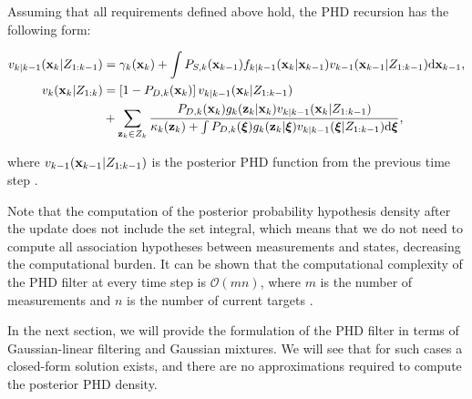 \begin{theorem}\label{theorem:phd-recursion}
    Assuming that all requirements defined above hold, the PHD recursion has the following form:

    \begin{align}
        v_{k|k-1}(\vecat{x}{k} | Z_{1:k-1})
        &= \gamma_k(\vecat{x}{k}) + \int P_{S,k}(\vecat{x}{k-1}) f_{k|k-1}(\vecat{x}{k} | \vecat{x}{k-1}) v_{k-1}(\vecat{x}{k-1} | Z_{1:k-1}) \mathrm{d} \vecat{x}{k-1}, \\
        v_k(\vecat{x}{k} | Z_{1:k})
        &= \left[1-P_{D,k}(\vecat{x}{k})\right] v_{k|k-1}(\vecat{x}{k} | Z_{1:k-1}) \\
        &+ \sum_{\vecat{z}{k} \in Z_k} \frac{
            P_{D,k}(\vecat{x}{k}) g_k(\vecat{z}{k} | \vecat{x}{k}) v_{k|k-1}(\vecat{x}{k} | Z_{1:k-1})
        }{
            \kappa_k(\vecat{z}{k}) + \int P_{D,k}(\boldsymbol{\xi}) g_k(\vecat{z}{k} | \boldsymbol{\xi}) v_{k|k-1}(\boldsymbol{\xi} | Z_{1:k-1}) \mathrm{d} \boldsymbol{\xi}
        },
    \end{align}

    \noindent where $v_{k-1}(\vecat{x}{k-1} | Z_{1:k-1})$ is the posterior PHD function from the previous time step \cite{voGaussianMixtureProbability2006} \cite[588--591]{mahlerStatisticalMultisourcemultitargetInformation2007}.
\end{theorem}

Note that the computation of the posterior probability hypothesis density after the update does not include the set integral, which means that we do not need to compute all association hypotheses between measurements and states, decreasing the computational burden. It can be shown that the computational complexity of the PHD filter at every time step is $\mathcal{O}(mn)$, where $m$ is the number of measurements and $n$ is the number of current targets \cite[592]{mahlerStatisticalMultisourcemultitargetInformation2007}.

In the next section, we will provide the formulation of the PHD filter in terms of Gaussian-linear filtering and Gaussian mixtures. We will see that for such cases a closed-form solution exists, and there are no approximations required to compute the posterior PHD density.

